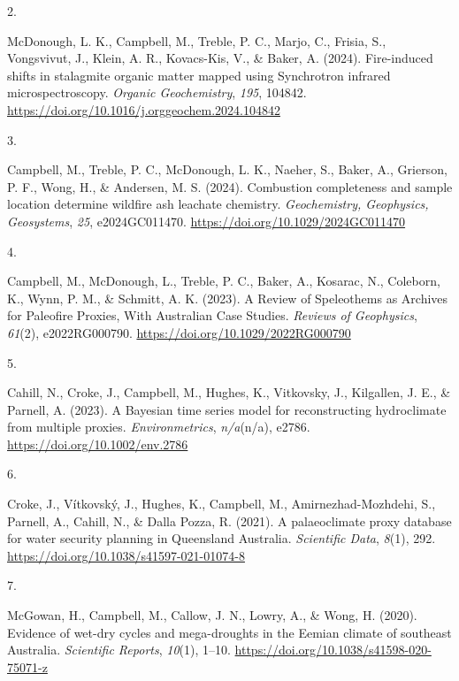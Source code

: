 \documentclass[11pt,a4paper,]{moderncv}
\newlength{\csllabelwidth}
\newcommand{\CSLLeftMargin}[1]{\parbox[t]{\csllabelwidth}{#1}}
\newcommand{\CSLRightInline}[1]{\parbox[t]{\linewidth - \csllabelwidth}{#1}}
\begin{document}
\leavevmode{}%
\CSLLeftMargin{2. }%
\CSLRightInline{McDonough, L. K., Campbell, M., Treble, P. C., Marjo,
C., Frisia, S., Vongsvivut, J., Klein, A. R., Kovacs-Kis, V., \& Baker,
A. (2024). Fire-induced shifts in stalagmite organic matter mapped using
Synchrotron infrared microspectroscopy. \emph{Organic Geochemistry},
\emph{195}, 104842.
\url{https://doi.org/10.1016/j.orggeochem.2024.104842}}

\leavevmode{}%
\CSLLeftMargin{3. }%
\CSLRightInline{Campbell, M., Treble, P. C., McDonough, L. K., Naeher,
S., Baker, A., Grierson, P. F., Wong, H., \& Andersen, M. S. (2024).
Combustion completeness and sample location determine wildfire ash
leachate chemistry. \emph{Geochemistry, Geophysics, Geosystems},
\emph{25}, e2024GC011470. \url{https://doi.org/10.1029/2024GC011470}}

\leavevmode{}%
\CSLLeftMargin{4. }%
\CSLRightInline{Campbell, M., McDonough, L., Treble, P. C., Baker, A.,
Kosarac, N., Coleborn, K., Wynn, P. M., \& Schmitt, A. K. (2023). A
Review of Speleothems as Archives for Paleofire Proxies, With Australian
Case Studies. \emph{Reviews of Geophysics}, \emph{61}(2), e2022RG000790.
\url{https://doi.org/10.1029/2022RG000790}}

\leavevmode{}%
\CSLLeftMargin{5. }%
\CSLRightInline{Cahill, N., Croke, J., Campbell, M., Hughes, K.,
Vitkovsky, J., Kilgallen, J. E., \& Parnell, A. (2023). A Bayesian time
series model for reconstructing hydroclimate from multiple proxies.
\emph{Environmetrics}, \emph{n/a}(n/a), e2786.
\url{https://doi.org/10.1002/env.2786}}

\leavevmode{}%
\CSLLeftMargin{6. }%
\CSLRightInline{Croke, J., Vítkovský, J., Hughes, K., Campbell, M.,
Amirnezhad-Mozhdehi, S., Parnell, A., Cahill, N., \& Dalla Pozza, R.
(2021). A palaeoclimate proxy database for water security planning in
Queensland Australia. \emph{Scientific Data}, \emph{8}(1), 292.
\url{https://doi.org/10.1038/s41597-021-01074-8}}

\leavevmode{}%
\CSLLeftMargin{7. }%
\CSLRightInline{McGowan, H., Campbell, M., Callow, J. N., Lowry, A., \&
Wong, H. (2020). Evidence of wet-dry cycles and mega-droughts in the
Eemian climate of southeast Australia. \emph{Scientific Reports},
\emph{10}(1), 1--10. \url{https://doi.org/10.1038/s41598-020-75071-z}}
\end{document}
